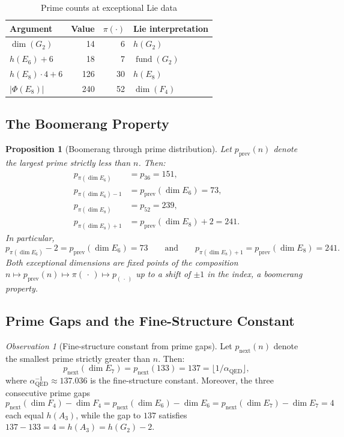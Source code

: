 \documentclass[11pt]{amsart}
\theoremstyle{plain}
\newtheorem{proposition}[theorem]{Proposition}
\theoremstyle{definition}
\theoremstyle{remark}
\newtheorem{observation}[theorem]{Observation}
\renewcommand{\Phi}{\varPhi}
\begin{document}
\begin{table}[h]
\centering
\caption{Prime counts at exceptional Lie data}
\label{tab:pi-exceptional}
\begin{tabular}{lrrl}
\hline
Argument & Value & $\pi(\cdot)$ & Lie interpretation\\
\hline
$\dim(G_2)$   & 14  & 6  & $h(G_2)$\\
$h(E_6)+6$    & 18  & 7  & $\operatorname{fund}(G_2)$\\
$h(E_8)\cdot 4+6$ & 126 & 30 & $h(E_8)$\\
$|\Phi(E_8)|$ & 240 & 52 & $\dim(F_4)$\\
\hline
\end{tabular}
\end{table}

\subsection{The Boomerang Property}

\begin{proposition}[Boomerang through prime distribution]
\label{prop:boomerang}
Let $p_{\mathrm{prev}}(n)$ denote the largest prime strictly less
than $n$.  Then:
\begin{align*}
  p_{\pi(\dim E_6)} &= p_{36} = 151,\\
  p_{\pi(\dim E_6)-1} &= p_{\mathrm{prev}}(\dim E_6) = 73,\\
  p_{\pi(\dim E_8)} &= p_{52} = 239,\\
  p_{\pi(\dim E_8)+1} &= p_{\mathrm{prev}}(\dim E_8) + 2 = 241.
\end{align*}
In particular,
\[
  p_{\pi(\dim E_6)} - 2 = p_{\mathrm{prev}}(\dim E_6) = 73
  \qquad\text{and}\qquad
  p_{\pi(\dim E_8)+1} = p_{\mathrm{prev}}(\dim E_8) = 241.
\]
Both exceptional dimensions are fixed points of the composition
$n \mapsto p_{\mathrm{prev}}(n) \mapsto \pi(\,\cdot\,) \mapsto p_{(\,\cdot\,)}$
up to a shift of $\pm 1$ in the index, a \emph{boomerang property}.
\end{proposition}

\subsection{Prime Gaps and the Fine-Structure Constant}

\begin{observation}[Fine-structure constant from prime gaps]
\label{obs:prime-gaps}
Let $p_{\mathrm{next}}(n)$ denote the smallest prime strictly greater
than $n$. Then:
\[
  p_{\mathrm{next}}(\dim E_7) = p_{\mathrm{next}}(133) = 137
  = \lfloor 1/\alpha_{\mathrm{QED}} \rfloor,
\]
where $\alpha_{\mathrm{QED}}^{-1} \approx 137.036$ is the
fine-structure constant. Moreover, the three consecutive prime gaps
\[
  p_{\mathrm{next}}(\dim F_4) - \dim F_4
  = p_{\mathrm{next}}(\dim E_6) - \dim E_6
  = p_{\mathrm{next}}(\dim E_7) - \dim E_7
  = 4
\]
each equal $h(A_3)$, while the gap to $137$ satisfies
$137 - 133 = 4 = h(A_3) = h(G_2) - 2$.
\end{observation}
\end{document}
